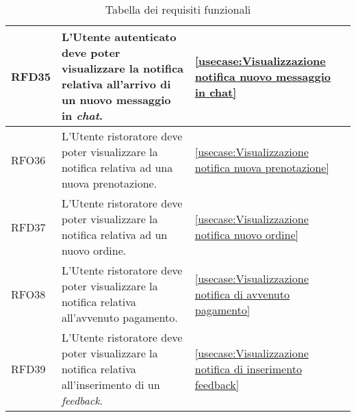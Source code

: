 \begin{table}[H]
\begin{tabularx}{\textwidth}{l|X|p{2cm}}
		\hline
		RFD35       & L'Utente autenticato deve poter visualizzare la notifica relativa all'arrivo di un nuovo messaggio in \textit{chat}.       & \autoref{usecase:Visualizzazione notifica nuovo messaggio in chat}                    \\
		\hline
		RFO36       & L'Utente ristoratore deve poter visualizzare la notifica relativa ad una nuova prenotazione.                      & \autoref{usecase:Visualizzazione notifica nuova prenotazione}                               \\
		\hline
		RFD37       & L'Utente ristoratore deve poter visualizzare la notifica relativa ad un nuovo ordine.                             & \autoref{usecase:Visualizzazione notifica nuovo ordine}                               \\
		\hline
		RFO38       & L'Utente ristoratore deve poter visualizzare la notifica relativa all'avvenuto pagamento.                         & \autoref{usecase:Visualizzazione notifica di avvenuto pagamento}                      \\
		\hline
		RFD39       & L'Utente ristoratore deve poter visualizzare la notifica relativa all'inserimento di un \textit{feedback}.                 & \autoref{usecase:Visualizzazione notifica di inserimento feedback}                    \\
	\end{tabularx}
	\caption{Tabella dei requisiti funzionali}
\end{table}


